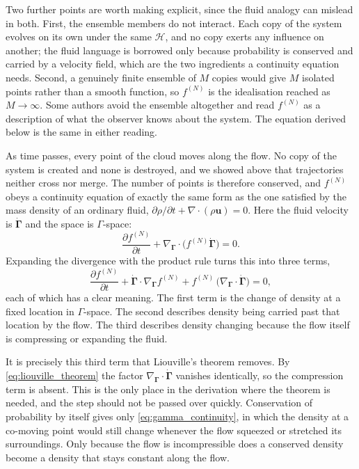 \documentclass[12pt]{article}
\renewcommand{\vec}[1]{\bm{#1}}
\begin{document}
Two further points are worth making explicit, since the fluid analogy
can mislead in both.  First, the ensemble members do not interact.
Each copy of the system evolves on its own under the same
$\mathcal H$, and no copy exerts any influence on another; the fluid
language is borrowed only because probability is conserved and carried
by a velocity field, which are the two ingredients a continuity
equation needs.  Second, a genuinely finite ensemble of $M$ copies
would give $M$ isolated points rather than a smooth function, so
$f^{(N)}$ is the idealisation reached as $M\to\infty$.  Some authors
avoid the ensemble altogether and read $f^{(N)}$ as a description of
what the observer knows about the system.  The equation derived below
is the same in either reading.

As time passes, every point of the cloud moves along the flow.  No copy
of the system is created and none is destroyed, and we showed above
that trajectories neither cross nor merge.  The number of points is
therefore conserved, and $f^{(N)}$ obeys a continuity equation of
exactly the same form as the one satisfied by the mass density of an
ordinary fluid, $\partial\rho/\partial t + \nabla\!\cdot\!(\rho\vec u)
= 0$.  Here the fluid velocity is $\dot{\vec\Gamma}$ and the space is
$\Gamma$-space:
%
\begin{equation}
  \frac{\partial f^{(N)}}{\partial t}
   + \nabla_{\!\vec\Gamma}\!\cdot\!\bigl(f^{(N)}\dot{\vec\Gamma}\bigr) = 0 .
  \label{eq:gamma_continuity}
\end{equation}
%
Expanding the divergence with the product rule turns this into three
terms,
%
\begin{equation}
  \frac{\partial f^{(N)}}{\partial t}
   + \dot{\vec\Gamma}\!\cdot\!\nabla_{\!\vec\Gamma} f^{(N)}
   + f^{(N)}\,\bigl(\nabla_{\!\vec\Gamma}\!\cdot\!\dot{\vec\Gamma}\bigr)
   = 0 ,
  \label{eq:gamma_continuity_expanded}
\end{equation}
%
each of which has a clear meaning.  The first term is the change of
density at a fixed location in $\Gamma$-space.  The second describes
density being carried past that location by the flow.  The third
describes density changing because the flow itself is compressing or
expanding the fluid.

It is precisely this third term that Liouville's theorem removes.  By
\eqref{eq:liouville_theorem} the factor
$\nabla_{\!\vec\Gamma}\!\cdot\!\dot{\vec\Gamma}$ vanishes identically,
so the compression term is absent.  This is the only place in the
derivation where the theorem is needed, and the step should not be
passed over quickly.  Conservation of probability by itself gives only
\eqref{eq:gamma_continuity}, in which the density at a co-moving point
would still change whenever the flow squeezed or stretched its
surroundings.  Only because the flow is incompressible does a conserved
density become a density that stays constant along the flow.
\end{document}
